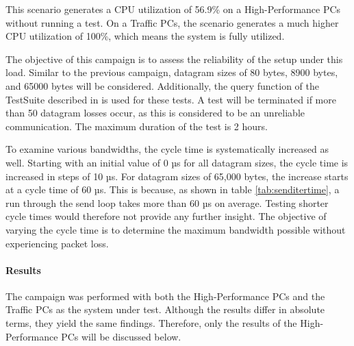 This scenario generates a CPU utilization of 56.9\% on a High-Performance PCs without running a test. On a Traffic PCs, the scenario generates a much higher CPU utilization of 100\%, which means the system is fully utilized.

The objective of this campaign is to assess the reliability of the setup under this load. Similar to the previous campaign, datagram sizes of 80 bytes, 8900 bytes, and 65000 bytes will be considered. Additionally, the query function of the TestSuite described in \label{chap:targetcom:query} is used for these tests. A test will be terminated if more than 50 datagram losses occur, as this is considered to be an unreliable communication. The maximum duration of the test is 2 hours.

To examine various bandwidths, the cycle time is systematically increased as well. Starting with an initial value of 0 µs for all datagram sizes, the cycle time is increased in steps of 10 µs. For datagram sizes of 65,000 bytes, the increase starts at a cycle time of 60 µs. This is because, as shown in table \ref{tab:senditertime}, a run through the send loop takes more than 60 µs on average. Testing shorter cycle times would therefore not provide any further insight. The objective of varying the cycle time is to determine the maximum bandwidth possible without experiencing packet loss.

\paragraph{Results}
The campaign was performed with both the High-Performance PCs and the Traffic PCs as the system under test. Although the results differ in absolute terms, they yield the same findings. Therefore, only the results of the High-Performance PCs will be discussed below.

